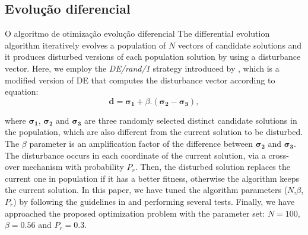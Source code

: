 \subsection{Evolução diferencial}

O algoritmo de otimização evolução diferencial 
The differential evolution algorithm iteratively evolves a population of $N$ vectors of candidate solutions and it produces disturbed versions of each population solution by using a disturbance vector. Here, we employ the  \emph{DE/rand/1} strategy introduced by \cite{Storn:1996},  which is a modified version of DE that computes the disturbance vector according to equation:
\begin{equation}
\boldsymbol{d} = \boldsymbol{\sigma_1} + \beta.(\boldsymbol{\sigma_2} - \boldsymbol{\sigma_3}),
\end{equation}

\noindent where $\boldsymbol{\sigma_1}$, $\boldsymbol{\sigma_2}$ and $\boldsymbol{\sigma_3}$ are three randomly selected distinct candidate solutions in the population, which are also different from the current solution to be disturbed.  The $\beta$ parameter is an amplification factor of the difference between $\boldsymbol{\sigma_2}$ and $\boldsymbol{\sigma_3}$. The disturbance occurs in each coordinate of the current solution, via a cross-over mechanism with probability $P_r$. Then, the disturbed solution replaces the current one in population if it has a better fitness, otherwise the algorithm keeps the current solution. 
In this paper, we have tuned the algorithm parameters ($N$,$\beta$,$P_r$) by following the guidelines in \cite{Storn:1996} and performing several tests. Finally,  we have approached the proposed optimization problem with the  parameter set: $N = 100$, $\beta = 0.56$ and $P_r = 0.3$.


